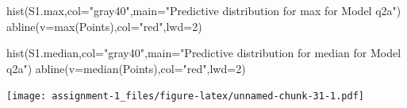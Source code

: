 \documentclass[
]{article}
\newenvironment{Shaded}{\begin{snugshade}}{\end{snugshade}}
\newcommand{\AttributeTok}[1]{\textcolor[rgb]{0.77,0.63,0.00}{#1}}
\newcommand{\DecValTok}[1]{\textcolor[rgb]{0.00,0.00,0.81}{#1}}
\newcommand{\FunctionTok}[1]{\textcolor[rgb]{0.00,0.00,0.00}{#1}}
\newcommand{\NormalTok}[1]{#1}
\newcommand{\StringTok}[1]{\textcolor[rgb]{0.31,0.60,0.02}{#1}}
\begin{document}
\begin{Shaded}
\begin{Highlighting}[]
\FunctionTok{hist}\NormalTok{(S1.max,}\AttributeTok{col=}\StringTok{"gray40"}\NormalTok{,}\AttributeTok{main=}\StringTok{"Predictive distribution for max for Model q2a"}\NormalTok{)}
\FunctionTok{abline}\NormalTok{(}\AttributeTok{v=}\FunctionTok{max}\NormalTok{(Points),}\AttributeTok{col=}\StringTok{"red"}\NormalTok{,}\AttributeTok{lwd=}\DecValTok{2}\NormalTok{)}

\FunctionTok{hist}\NormalTok{(S1.median,}\AttributeTok{col=}\StringTok{"gray40"}\NormalTok{,}\AttributeTok{main=}\StringTok{"Predictive distribution for median for Model q2a"}\NormalTok{)}
\FunctionTok{abline}\NormalTok{(}\AttributeTok{v=}\FunctionTok{median}\NormalTok{(Points),}\AttributeTok{col=}\StringTok{"red"}\NormalTok{,}\AttributeTok{lwd=}\DecValTok{2}\NormalTok{)}
\end{Highlighting}
\end{Shaded}

\texttt{[image: assignment-1\_files/figure-latex/unnamed-chunk-31-1.pdf]}
\end{document}
